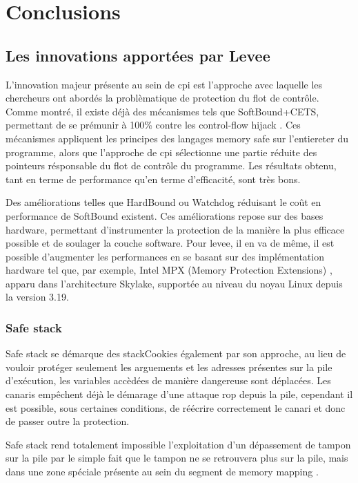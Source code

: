 \chapter{Conclusions}
\label{chap:conclusions}

\section{Les innovations apportées par Levee}

L'innovation majeur présente au sein de \gls{cpi} est l'approche avec laquelle
les chercheurs ont abordés la problèmatique de protection du flot de contrôle.
Comme montré, il existe déjà des mécanismes tels que SoftBound+CETS,
permettant de se prémunir à 100\% contre les \og control-flow hijack \fg.
Ces mécanismes appliquent les principes des langages \og memory safe \fg sur
l'entiereter du programme, alors que l'approche de \gls{cpi} sélectionne une
partie réduite des pointeurs résponsable du flot de contrôle du programme.
Les résultats obtenu, tant en terme de performance qu'en terme d'efficacité,
sont très bons.

Des améliorations telles que HardBound ou Watchdog réduisant le coût en
performance de SoftBound existent. Ces améliorations repose sur des bases
hardware, permettant d'instrumenter la protection de la manière la plus efficace
possible et de soulager la couche software. Pour \gls{levee}, il en va de même,
il est possible d'augmenter les performances en se basant sur des implémentation
hardware tel que, par exemple, Intel MPX (Memory Protection Extensions)
\cite{IntelMPX}, apparu dans l'architecture Skylake, supportée au niveau
du noyau Linux depuis la version 3.19.

\subsection{\og Safe stack \fg}

\og Safe stack \fg se démarque des \og \gls{stackCookies} \fg également par
son approche, au lieu de vouloir protéger seulement les arguements et les adresses
présentes sur la pile d'exécution, les variables accèdées de manière dangereuse
sont déplacées. Les canaris empêchent déjà le démarage d'une attaque \gls{rop} depuis
la pile, cependant il est possible, sous certaines conditions, de réécrire correctement
le canari et donc de passer outre la protection.

\og Safe stack \fg rend totalement impossible l'exploitation d'un dépassement de
tampon sur la pile par le simple fait que le tampon ne se retrouvera plus sur la pile,
mais dans une zone spéciale présente au sein du segment de \og memory mapping \fg.

